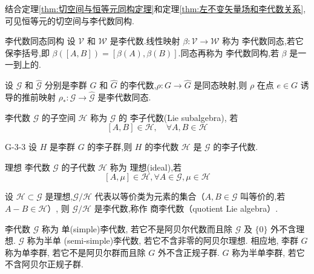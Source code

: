 \documentclass[../main.tex]{subfiles}
\begin{document}
     结合定理\ref{thm:切空间与恒等元同构定理}和定理\ref{thm:左不变矢量场和李代数关系},可见恒等元的切空间与李代数同构.
 \begin{definition}{}{李代数同态同构}
     设 $\mathscr{V}$ 和 $\mathscr{W}$ 是李代数.线性映射 $\beta : \mathscr{V}\rightarrow\mathscr{W}$ 称为 李代数同态,若它保李括号,即 $\beta([A,B]) = [\beta(A),\beta(B)]$.同态再称为 李代数同构,若 $\beta$ 是一一到上的.
 \end{definition}
 \begin{theorem}
     设 $\mathscr{G}$ 和 $\hat{\mathscr{G}}$ 分别是李群 $G$ 和 $\hat{G}$ 的李代数,$\rho:G\rightarrow\hat{G}$ 是同态映射,则 $\rho$ 在点 $e\in G$ 诱导的推前映射 $\rho_*:\mathscr{G}\rightarrow\hat{\mathscr{G}}$ 是李代数同态.
 \end{theorem}
 \begin{definition}
     李代数 $\mathscr{G}$ 的子空间 $\mathscr{H}$ 称为 $\mathscr{G}$ 的  李子代数(Lie subalgebra), 若
     $$ [A, B]\in\mathscr{H},\quad \forall A, B \in \mathscr{H} $$
 \end{definition}
 \begin{theorem}{}{G-3-3}
     设 $H$ 是李群 $G$ 的李子群,则 $H$ 的李代数 $\mathscr{H}$ 是 $\mathscr{G}$ 的李子代数.
 \end{theorem}
\begin{definition}{}{理想}
	李代数 $\mathscr{G}$ 的子代数 $\mathscr{H}$ 称为 理想(ideal),若
	$$ [A,\mu] \in \mathscr{H},\forall  A\in\mathscr{G},\mu \in \mathscr{H} $$
\end{definition}
\begin{theorem}{}
	设 $\mathscr{H}\subset\mathscr{G}$ 是理想,$\mathscr{G}/\mathscr{H}$ 代表以等价类为元素的集合（$A,B\in \mathscr{G}$ 叫等价的,若 $A-B\in\mathscr{H}$）, 则 $\mathscr{G}/\mathscr{H}$ 是李代数,称作 商李代数（quotient Lie algebra）.
\end{theorem}
 \begin{definition}
     李代数 $  \mathscr{G}  $ 称为 单(simple)李代数, 若它不是阿贝尔代数而且除 $\mathscr{G}  $ 及 $  \{0\}$ 外不含理想. $ \mathscr{G}$ 称为半单 (semi-simple)李代数, 若它不含非零的阿贝尔理想. 相应地, 李群 $  G  $ 称为单李群, 若它不是阿贝尔群而且除 $  G  $ 外不含正规子群. $ G  $ 称为半单李群, 若它不含阿贝尔正规子群.
 \end{definition}
\end{document}
